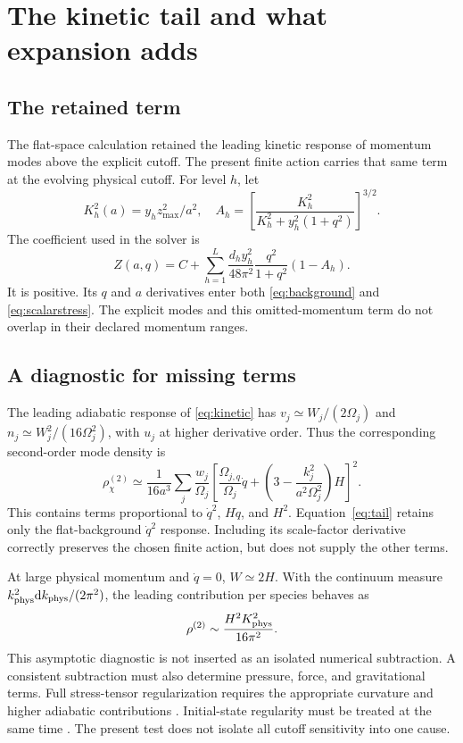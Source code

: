 \documentclass[11pt]{article}
\theoremstyle{definition}\newtheorem{definition}[theorem]{Definition}
\newcommand{\dd}{\mathrm d}\newcommand{\Tr}{\mathcal T}\newcommand{\Ezero}{E_0}
\begin{document}
\section{The kinetic tail and what expansion adds}
\subsection{The retained term}
The flat-space calculation retained the leading kinetic response of momentum modes above the explicit cutoff. The present finite action carries that same term at the evolving physical cutoff. For level $h$, let
\begin{equation}
K_h^2(a)=y_hz_{\max}^2/a^2,\quad
A_h=\left[\frac{K_h^2}{K_h^2+y_h^2(1+q^2)}\right]^{3/2}.
\end{equation}
The coefficient used in the solver is
\begin{equation}
Z(a,q)=C+\sum_{h=1}^L\frac{d_hy_h^2}{48\pi^2}
\frac{q^2}{1+q^2}(1-A_h).\label{eq:tail}
\end{equation}
It is positive. Its $q$ and $a$ derivatives enter both \eqref{eq:background} and \eqref{eq:scalarstress}. The explicit modes and this omitted-momentum term do not overlap in their declared momentum ranges.

\subsection{A diagnostic for missing terms}
The leading adiabatic response of \eqref{eq:kinetic} has
$v_j\simeq W_j/(2\Omega_j)$ and $n_j\simeq W_j^2/(16\Omega_j^2)$, with $u_j$ at higher derivative order. Thus the corresponding second-order mode density is
\begin{equation}
\rho_\chi^{(2)}\simeq\frac{1}{16a^3}\sum_j\frac{w_j}{\Omega_j}
\left[\frac{\Omega_{j,q}}{\Omega_j}\dot q+
\left(3-\frac{k_j^2}{a^2\Omega_j^2}\right)H\right]^2.\label{eq:adiabatic}
\end{equation}
This contains terms proportional to $\dot q^2$, $H\dot q$, and $H^2$. Equation~\eqref{eq:tail} retains only the flat-background $\dot q^2$ response. Including its scale-factor derivative correctly preserves the chosen finite action, but does not supply the other terms.

At large physical momentum and $\dot q=0$, $W\simeq2H$. With the continuum measure $k_{\rm phys}^2\dd k_{\rm phys}/(2\pi^2)$, the leading contribution per species behaves as
\begin{equation}
\rho^{(2)}\sim \frac{H^2K_{\rm phys}^2}{16\pi^2}.
\end{equation}
This asymptotic diagnostic is not inserted as an isolated numerical subtraction. A consistent subtraction must also determine pressure, force, and gravitational terms. Full stress-tensor regularization requires the appropriate curvature and higher adiabatic contributions \cite{ferreiro}. Initial-state regularity must be treated at the same time \cite{baacke}. The present test does not isolate all cutoff sensitivity into one cause.
\end{document}
